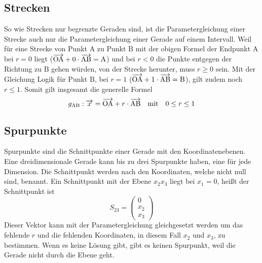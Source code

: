 \documentclass{article}
\begin{document}
\subsection{Strecken} 
\begin{wrapfigure}{l}{6cm}
  \centering
\end{wrapfigure}  
So wie Strecken nur begrenzte Geraden sind, ist die Parametergleichung einer Strecke auch nur die Parametergleichung einer Gerade auf einem Intervall. Weil für eine Strecke von Punkt $\mathrm{A}$ zu Punkt $\mathrm{B}$ mit der obigen Formel der Endpunkt $\mathrm{A}$ bei $r=0$ liegt (${\overrightarrow{\mathrm{OA}} + 0 \cdot \overrightarrow{\mathrm{AB}} = \mathrm{A}}$) und bei $r < 0$ die Punkte entgegen der Richtung zu $\mathrm{B}$ gehen würden, von der Strecke herunter, muss $r \geq 0$ sein. Mit der Gleichung Logik für Punkt $\mathrm{B}$, bei $r=1$ ($\overrightarrow{\mathrm{OA}} + 1 \cdot \overrightarrow{\mathrm{AB}} = \mathrm{B}$), gilt zudem noch $r \leq 1$. Somit gilt insgesamt die generelle Formel 
\[
 g_{\mathrm{AB}}: \overrightarrow{x} = \overrightarrow{\mathrm{OA}} + r \cdot \overrightarrow{\mathrm{AB}}
 \quad \text{mit} \quad
 0 \leq r \leq 1 
\]
 
\subsection{Spurpunkte}
Spurpunkte sind die Schnittpunkte einer Gerade mit den Koordinatenebenen.
Eine dreidimensionale Gerade kann bis zu drei Spurpunkte haben, eine für jede Dimension. Die Schnittpunkt werden nach den Koordinaten, welche nicht null sind, benannt. \newline
Ein Schnittpunkt mit der Ebene $x_2x_3$ liegt bei $x_1 = 0$, heißt der Schnittpunkt ist
\[
 S_{23} = \begin{pmatrix} 0 \\ x_2 \\ x_3 \end{pmatrix} 
\]
Dieser Vektor kann mit der Parametergleichung gleichgesetzt werden um das fehlende $r$ und die fehlenden Koordinaten, in diesem Fall $x_2$ und $x_3$, zu bestimmen. Wenn es keine Lösung gibt, gibt es keinen Spurpunkt, weil die Gerade nicht durch die Ebene geht.
 
\end{document}
